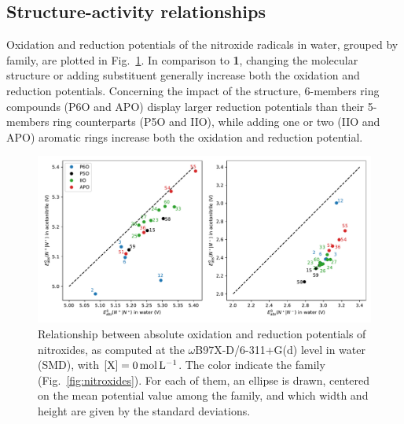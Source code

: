 \documentclass[review]{elsarticle}
\begin{document}
\subsection{Structure-activity relationships}

Oxidation and reduction potentials of the nitroxide radicals in water, grouped by family, are plotted in Fig.~\ref{fig:family}. In comparison to \textbf{1}, changing the molecular structure or adding substituent generally increase both the oxidation and reduction potentials. Concerning the impact of the structure, 6-members ring compounds (P6O and APO)  display larger reduction potentials than their 5-members ring counterparts (P5O and  IIO), while adding one or two (IIO and APO) aromatic rings increase both the oxidation and reduction potential. 

\begin{figure}[!h]
	\centering
	\includegraphics[width=.9\linewidth]{Figure7}
	\caption{Relationship between absolute oxidation and reduction potentials of nitroxides, as computed at the $\omega$B97X-D/6-311+G(d) level in water (SMD), with $[\ce{X}]=\SI{0}{\mole\per\liter}$. The color indicate the family (Fig.~\ref{fig:nitroxides}). For each of them, an ellipse is drawn, centered on the mean potential value among the family, and which width and height are given by the standard deviations.}
	\label{fig:family}
\end{figure}
\end{document}
